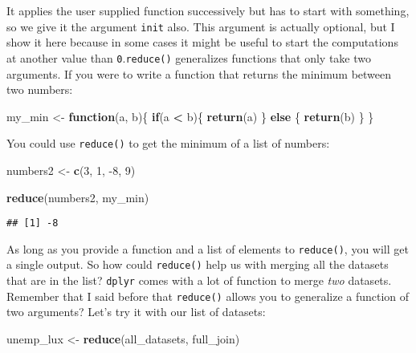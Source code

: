 \documentclass[
]{article}
\newenvironment{Shaded}{\begin{snugshade}}{\end{snugshade}}
\newcommand{\ControlFlowTok}[1]{\textcolor[rgb]{0.13,0.29,0.53}{\textbf{#1}}}
\newcommand{\DecValTok}[1]{\textcolor[rgb]{0.00,0.00,0.81}{#1}}
\newcommand{\KeywordTok}[1]{\textcolor[rgb]{0.13,0.29,0.53}{\textbf{#1}}}
\newcommand{\NormalTok}[1]{#1}
\newcommand{\OperatorTok}[1]{\textcolor[rgb]{0.81,0.36,0.00}{\textbf{#1}}}
\newcommand{\StringTok}[1]{\textcolor[rgb]{0.31,0.60,0.02}{#1}}
\begin{document}
It applies the user supplied function successively but has to start with something, so we give it
the argument \texttt{init} also. This argument is actually optional, but I show it here because in some
cases it might be useful to start the computations at another value than \texttt{0}.\texttt{reduce()}
generalizes functions that only take two arguments. If you were to write a function that returns
the minimum between two numbers:

\begin{Shaded}
\begin{Highlighting}[]
\NormalTok{my\_min \textless{}{-}}\StringTok{ }\ControlFlowTok{function}\NormalTok{(a, b)\{}
    \ControlFlowTok{if}\NormalTok{(a }\OperatorTok{\textless{}}\StringTok{ }\NormalTok{b)\{}
        \KeywordTok{return}\NormalTok{(a)}
\NormalTok{    \} }\ControlFlowTok{else}\NormalTok{ \{}
        \KeywordTok{return}\NormalTok{(b)}
\NormalTok{    \}}
\NormalTok{\}}
\end{Highlighting}
\end{Shaded}

You could use \texttt{reduce()} to get the minimum of a list of numbers:

\begin{Shaded}
\begin{Highlighting}[]
\NormalTok{numbers2 \textless{}{-}}\StringTok{ }\KeywordTok{c}\NormalTok{(}\DecValTok{3}\NormalTok{, }\DecValTok{1}\NormalTok{, }\DecValTok{{-}8}\NormalTok{, }\DecValTok{9}\NormalTok{)}

\KeywordTok{reduce}\NormalTok{(numbers2, my\_min)}
\end{Highlighting}
\end{Shaded}

\begin{verbatim}
## [1] -8
\end{verbatim}

As long as you provide a function and a list of elements to \texttt{reduce()}, you will get a single
output. So how could \texttt{reduce()} help us with merging all the datasets that are in the list? \texttt{dplyr}
comes with a lot of function to merge \emph{two} datasets. Remember that I said before that \texttt{reduce()}
allows you to generalize a function of two arguments? Let's try it with our list of datasets:

\begin{Shaded}
\begin{Highlighting}[]
\NormalTok{unemp\_lux \textless{}{-}}\StringTok{ }\KeywordTok{reduce}\NormalTok{(all\_datasets, full\_join)}
\end{Highlighting}
\end{Shaded}
\end{document}
